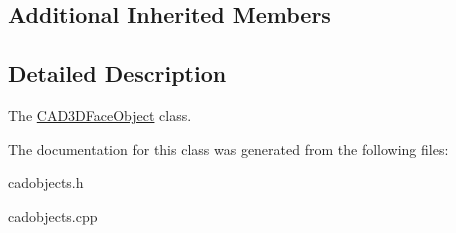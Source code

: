 \subsection*{Additional Inherited Members}


\subsection{Detailed Description}
The \hyperlink{class_c_a_d3_d_face_object}{C\+A\+D3\+D\+Face\+Object} class. 

The documentation for this class was generated from the following files\+:\begin{DoxyCompactItemize}
\item 
cadobjects.\+h\item 
cadobjects.\+cpp\end{DoxyCompactItemize}
